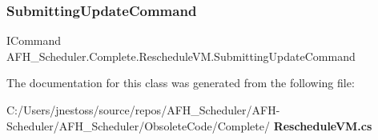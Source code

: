 \subsubsection{SubmittingUpdateCommand}
{\footnotesize\ttfamily I\+Command A\+F\+H\+\_\+\+Scheduler.\+Complete.\+Reschedule\+V\+M.\+Submitting\+Update\+Command\hspace{0.3cm}{\ttfamily [get]}}



The documentation for this class was generated from the following file\+:\begin{DoxyCompactItemize}
\item 
C\+:/\+Users/jnestoss/source/repos/\+A\+F\+H\+\_\+\+Scheduler/\+A\+F\+H-\/\+Scheduler/\+A\+F\+H\+\_\+\+Scheduler/\+Obsolete\+Code/\+Complete/\textbf{ Reschedule\+V\+M.\+cs}\end{DoxyCompactItemize}
